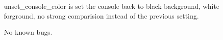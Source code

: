 
\begin{DoxyRefList}
\item[\label{bug__bug000001}%
\hypertarget{bug__bug000001}{}%
File \hyperlink{color_8h}{color.h} ]unset\+\_\+console\+\_\+color is set the console back to black background, white forground, no strong comparision instead of the previous setting.  
\item[\label{bug__bug000002}%
\hypertarget{bug__bug000002}{}%
File \hyperlink{config_8h}{config.h} ]No known bugs. 
\end{DoxyRefList}